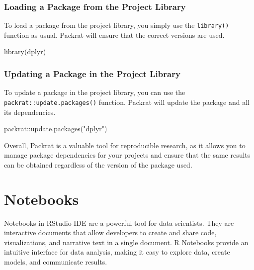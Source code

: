 \documentclass[
]{book}
\newenvironment{Shaded}{\begin{snugshade}}{\end{snugshade}}
\newcommand{\FunctionTok}[1]{\textcolor[rgb]{0.00,0.00,0.00}{#1}}
\newcommand{\NormalTok}[1]{#1}
\newcommand{\SpecialCharTok}[1]{\textcolor[rgb]{0.00,0.00,0.00}{#1}}
\newcommand{\StringTok}[1]{\textcolor[rgb]{0.31,0.60,0.02}{#1}}
\begin{document}
\hypertarget{loading-a-package-from-the-project-library}{%
\subsubsection{Loading a Package from the Project Library}\label{loading-a-package-from-the-project-library}}

To load a package from the project library, you simply use the \texttt{library()} function as usual. Packrat will ensure that the correct versions are used.

\begin{Shaded}
\begin{Highlighting}[]
\FunctionTok{library}\NormalTok{(dplyr)}
\end{Highlighting}
\end{Shaded}

\hypertarget{updating-a-package-in-the-project-library}{%
\subsubsection{Updating a Package in the Project Library}\label{updating-a-package-in-the-project-library}}

To update a package in the project library, you can use the \texttt{packrat::update.packages()} function. Packrat will update the package and all its dependencies.

\begin{Shaded}
\begin{Highlighting}[]
\NormalTok{packrat}\SpecialCharTok{::}\FunctionTok{update.packages}\NormalTok{(}\StringTok{"dplyr"}\NormalTok{)}
\end{Highlighting}
\end{Shaded}

Overall, Packrat is a valuable tool for reproducible research, as it allows you to manage package dependencies for your projects and ensure that the same results can be obtained regardless of the version of the package used.

\hypertarget{notebooks}{%
\section{Notebooks}\label{notebooks}}

Notebooks in RStudio IDE are a powerful tool for data scientists. They are interactive documents that allow developers to create and share code, visualizations, and narrative text in a single document. R Notebooks provide an intuitive interface for data analysis, making it easy to explore data, create models, and communicate results.
\end{document}
